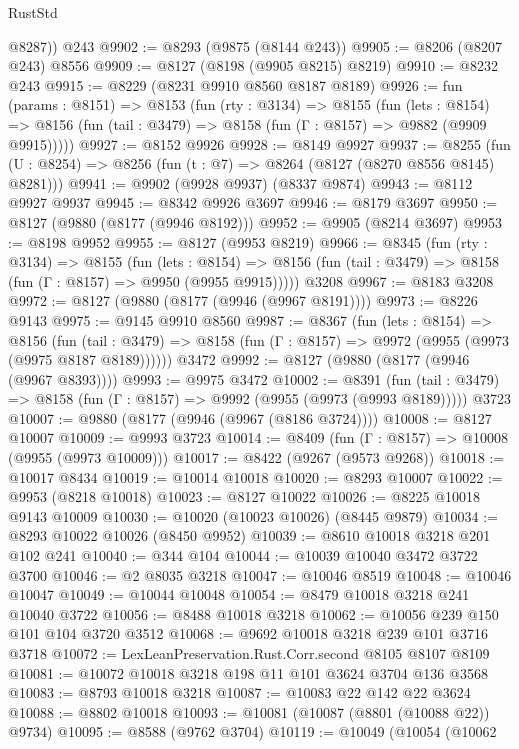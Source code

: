 \begin{lexlean}{RustStd}
\begin{coremodule}
        @8287))
    @243
@9902 := @8293 (@9875 (@8144 @243))
@9905 := @8206 (@8207 @243) @8556
@9909 := @8127 (@8198 (@9905 @8215) @8219)
@9910 := @8232 @243
@9915 := @8229 (@8231 @9910 @8560 @8187 @8189)
@9926 := fun (params : @8151) =>
  @8153
    (fun (rty : @3134) =>
    @8155
      (fun (lets : @8154) =>
      @8156 (fun (tail : @3479) => @8158 (fun (Γ : @8157) => @9882 (@9909 @9915)))))
@9927 := @8152 @9926
@9928 := @8149 @9927
@9937 := @8255 (fun (U : @8254) => @8256 (fun (t : @7) => @8264 (@8127 (@8270 @8556 @8145) @8281)))
@9941 := @9902 (@9928 @9937) (@8337 @9874)
@9943 := @8112 @9927 @9937
@9945 := @8342 @9926 @3697
@9946 := @8179 @3697
@9950 := @8127 (@9880 (@8177 (@9946 @8192)))
@9952 := @9905 (@8214 @3697)
@9953 := @8198 @9952
@9955 := @8127 (@9953 @8219)
@9966 := @8345
    (fun (rty : @3134) =>
    @8155
      (fun (lets : @8154) =>
      @8156 (fun (tail : @3479) => @8158 (fun (Γ : @8157) => @9950 (@9955 @9915)))))
    @3208
@9967 := @8183 @3208
@9972 := @8127 (@9880 (@8177 (@9946 (@9967 @8191))))
@9973 := @8226 @9143
@9975 := @9145 @9910 @8560
@9987 := @8367
    (fun (lets : @8154) =>
    @8156
      (fun (tail : @3479) => @8158 (fun (Γ : @8157) => @9972 (@9955 (@9973 (@9975 @8187 @8189))))))
    @3472
@9992 := @8127 (@9880 (@8177 (@9946 (@9967 @8393))))
@9993 := @9975 @3472
@10002 := @8391
    (fun (tail : @3479) => @8158 (fun (Γ : @8157) => @9992 (@9955 (@9973 (@9993 @8189)))))
    @3723
@10007 := @9880 (@8177 (@9946 (@9967 (@8186 @3724))))
@10008 := @8127 @10007
@10009 := @9993 @3723
@10014 := @8409 (fun (Γ : @8157) => @10008 (@9955 (@9973 @10009)))
@10017 := @8422 (@9267 (@9573 @9268))
@10018 := @10017 @8434
@10019 := @10014 @10018
@10020 := @8293 @10007
@10022 := @9953 (@8218 @10018)
@10023 := @8127 @10022
@10026 := @8225 @10018 @9143 @10009
@10030 := @10020 (@10023 @10026) (@8445 @9879)
@10034 := @8293 @10022 @10026 (@8450 @9952)
@10039 := @8610 @10018 @3218 @201 @102 @241
@10040 := @344 @104
@10044 := @10039 @10040 @3472 @3722 @3700
@10046 := @2 @8035 @3218
@10047 := @10046 @8519
@10048 := @10046 @10047
@10049 := @10044 @10048
@10054 := @8479 @10018 @3218 @241 @10040 @3722
@10056 := @8488 @10018 @3218
@10062 := @10056 @239 @150 @101 @104 @3720 @3512
@10068 := @9692 @10018 @3218 @239 @101 @3716 @3718
@10072 := LexLeanPreservation.Rust.Corr.second @8105 @8107 @8109
@10081 := @10072 @10018 @3218 @198 @11 @101 @3624 @3704 @136 @3568
@10083 := @8793 @10018 @3218
@10087 := @10083 @22 @142 @22 @3624
@10088 := @8802 @10018
@10093 := @10081 (@10087 (@8801 (@10088 @22)) @9734)
@10095 := @8588 (@9762 @3704)
@10119 := @10049
    (@10054
      (@10062

\end{coremodule}
\end{lexlean}
